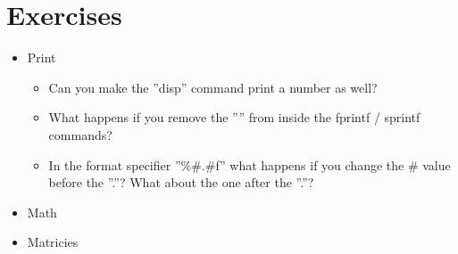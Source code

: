 \section{Exercises}
\begin{itemize}
 \item Print
 \begin{itemize}
  \item Can you make the ''disp'' command print a number as well?
  \item What happens if you remove the ''\verbatim{\n}'' from inside the fprintf / sprintf commands?
  \item In the format specifier ''\%\#.\#f'' what happens if you change the \# value before the ''.''? What about the one after the ''.''?
 \end{itemize}
 \item Math
 \item Matricies
\end{itemize}
